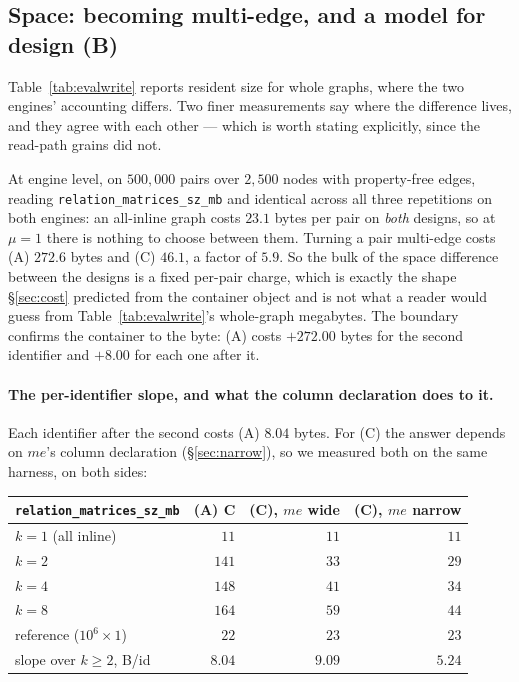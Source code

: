 \documentclass[11pt,a4paper]{article}
\theoremstyle{plain}
\theoremstyle{definition}
\theoremstyle{remark}
\begin{document}
\subsection{Space: becoming multi-edge, and a model for design (B)}
\label{sec:evalspace}

Table~\ref{tab:evalwrite} reports resident size for whole graphs, where the two
engines' accounting differs. Two finer measurements say where the difference
lives, and they agree with each other --- which is worth stating explicitly,
since the read-path grains did not.

At engine level, on $500{,}000$ pairs over $2{,}500$ nodes with property-free
edges, reading \texttt{relation\allowbreak\_matrices\allowbreak\_sz\allowbreak\_mb} and identical across all
three repetitions on both engines: an all-inline graph costs $23.1$ bytes per
pair on \emph{both} designs, so at $\mu = 1$ there is nothing to choose between
them. Turning a pair multi-edge costs (A) $272.6$ bytes and (C) $46.1$, a factor
of $5.9$. So the bulk of the space difference between the designs is a fixed
per-pair charge, which is exactly the shape \S\ref{sec:cost} predicted from the
container object and is not what a reader would guess from
Table~\ref{tab:evalwrite}'s whole-graph megabytes. The boundary confirms the
container to the byte: (A) costs $+272.00$ bytes for the second identifier and
$+8.00$ for each one after it.

\paragraph{The per-identifier slope, and what the column declaration does to
it.} Each identifier after the second costs (A) $8.04$ bytes. For (C) the
answer depends on $me$'s column declaration (\S\ref{sec:narrow}), so we measured
both on the same harness, on both sides:

\begin{center}
\begin{tabular}{@{}lrrr@{}}
\toprule
\texttt{relation\_matrices\_sz\_mb} & (A) C & (C), $me$ wide & (C), $me$ narrow \\
\midrule
$k = 1$ (all inline)    & $11$ & $11$ & $11$ \\
$k = 2$                 & $141$ & $33$ & $29$ \\
$k = 4$                 & $148$ & $41$ & $34$ \\
$k = 8$                 & $164$ & $59$ & $44$ \\
reference ($10^6 \times 1$) & $22$ & $23$ & $23$ \\
\midrule
slope over $k \ge 2$, B/id & $8.04$ & $9.09$ & $\mathbf{5.24}$ \\
\bottomrule
\end{tabular}
\end{center}
\end{document}

